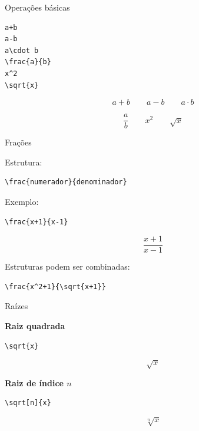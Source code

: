 \documentclass[aspectratio=169,xcolor=dvipsnames]{beamer}
\begin{document}

\begin{frame}[fragile]{Operações básicas}

\begin{lstlisting}
a+b
a-b
a\cdot b
\frac{a}{b}
x^2
\sqrt{x}
\end{lstlisting}

    \[
        a+b
        \qquad
        a-b
        \qquad
        a\cdot b
    \]

    \[
        \frac{a}{b}
        \qquad
        x^2
        \qquad
        \sqrt{x}
    \]

\end{frame}

\begin{frame}[fragile]{Frações}

    Estrutura:

\begin{lstlisting}
\frac{numerador}{denominador}
\end{lstlisting}

    Exemplo:

\begin{lstlisting}
\frac{x+1}{x-1}
\end{lstlisting}

    \[
        \frac{x+1}{x-1}
    \]

    \vspace{0.3cm}

    Estruturas podem ser combinadas:

\begin{lstlisting}
\frac{x^2+1}{\sqrt{x+1}}
\end{lstlisting}

\end{frame}

\begin{frame}[fragile]{Raízes}

    \textbf{Raiz quadrada}

\begin{lstlisting}
\sqrt{x}
\end{lstlisting}

    \[
        \sqrt{x}
    \]

    \textbf{Raiz de índice $n$}

\begin{lstlisting}
\sqrt[n]{x}
\end{lstlisting}

    \[
        \sqrt[n]{x}
    \]

\end{frame}
\end{document}
